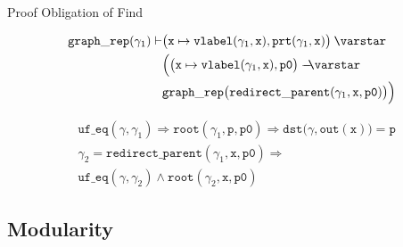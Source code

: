 \documentclass[professionalfonts, xcolor=table]{beamer}
\newcommand{\scon}{\mathbin{\varstar}}
\newcommand{\wand}{%
 \mathrel{\mbox{$\hspace*{-0.03em}\mathord{-}\hspace*{-0.66em}
  \mathord{-}\hspace*{-0.36em}\mathord{\scon}$\hspace*{-0.005em}}}}
\begin{document}
\begin{frame}{Proof Obligation of Find}
  \centering
  \colorbox{lightg}{\parbox{.9\textwidth}{
  \begin{align*}
    \mathtt{graph\_rep}(\gamma_1) \vdash & \big(\mathtt{x}\mapsto
    \mathtt{vlabel}(\gamma_1, \mathtt{x}), \mathtt{prt}(\gamma_1, \mathtt{x})\big)
    \scon \null\\
    & \Big(\big(\mathtt{x}\mapsto \mathtt{vlabel}(\gamma_1, \mathtt{x}),
    \mathtt{p0}\big) \wand \null\\
    & \mathtt{graph\_rep}\big(\mathtt{redirect\_parent}(\gamma_1,\mathtt{x},
    \mathtt{p0})\big)\Big)
  \end{align*}}}
  \pause
  \vskip15pt
  \colorbox{lightg}{\parbox{.9\textwidth}{
  \begin{align*}
    & \mathtt{uf\_eq}(\gamma, \gamma_1) \Rightarrow \mathtt{root}(\gamma_1, \mathtt{p},
    \mathtt{p0}) \Rightarrow \mathtt{dst}\big(\gamma, \mathtt{out}(\mathtt{x})\big)=
    \mathtt{p}\\
    & \gamma_2=\mathtt{redirect\_parent}(\gamma_1,\mathtt{x},\mathtt{p0}) \Rightarrow\\
    & \mathtt{uf\_eq}(\gamma, \gamma_2) \wedge \mathtt{root}(\gamma_2, \mathtt{x},
    \mathtt{p0})
  \end{align*}}}
\end{frame}

\subsection{Modularity}
\end{document}
